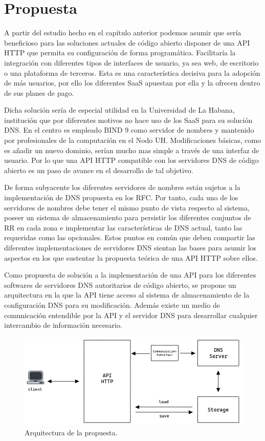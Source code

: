 \chapter{Propuesta}\label{chapter:proposal}

A partir del estudio hecho en el capítulo anterior podemos asumir que sería beneficioso para las soluciones actuales de código abierto disponer de una API HTTP que permita su configuración de forma programática. Facilitaría la integración con diferentes tipos de interfaces de usuario, ya sea web, de escritorio o una plataforma de terceros. Esta es una característica decisiva para la adopción de más usuarios, por ello los diferentes SaaS apuestan por ella y la ofrecen dentro de sus planes de pago.

Dicha solución sería de especial utilidad en la Universidad de La Habana, institución que por diferentes motivos no hace uso de los SaaS para su solución DNS. En el centro es empleado BIND 9 como servidor de nombres y mantenido por profesionales de la computación en el Nodo UH. Modificaciones básicas, como es añadir un nuevo dominio, serían mucho mas simple a través de una interfaz de usuario. Por lo que una API HTTP compatible con los servidores DNS de código abierto es un paso de avance en el desarrollo de tal objetivo.

De forma subyacente los diferentes servidores de nombres están sujetos a la implementación de DNS propuesta en los RFC. Por tanto, cada uno de los servidores de nombres debe tener el mismo punto de vista respecto al sistema, poseer un sistema de almacenamiento para persistir los diferentes conjuntos de RR en cada zona e implementar las características de DNS actual, tanto las requeridas como las opcionales. Estos puntos en común que deben compartir las diferentes implementaciones de servidores DNS sientan las bases para asumir los aspectos en los que sustentar la propuesta teórica de una API HTTP sobre ellos.

Como propuesta de solución a la implementación de una API para los diferentes softwares de servidores DNS autoritarios de código abierto, se propone un arquitectura en la que la API tiene acceso al sistema de almacenamiento de la configuración DNS para su modificación. Además existe un medio de comunicación entendible por la API y el servidor DNS para desarrollar cualquier intercambio de información necesario.

\begin{figure}[!ht]
    \centering
    \includegraphics[width=\linewidth]{draws/proposal.png}
    \caption{Arquitectura de la propuesta.}
\end{figure}

